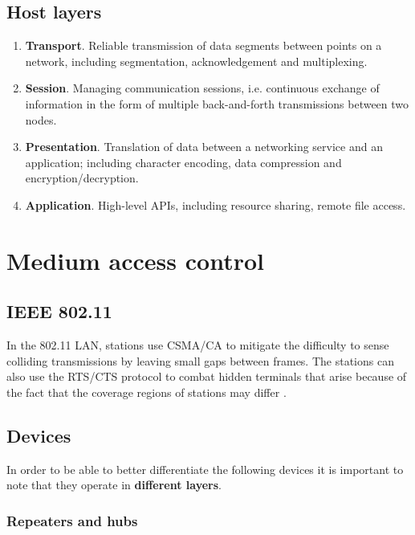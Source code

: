 \subsection{Host layers}

\begin{enumerate}
\item \textbf{Transport}. Reliable transmission of data segments between points on a network, including segmentation, acknowledgement and multiplexing.
\item \textbf{Session}. Managing communication sessions, i.e. continuous exchange of information in the form of multiple back-and-forth transmissions between two nodes.
\item \textbf{Presentation}. Translation of data between a networking service and an application; including character encoding, data compression and encryption/decryption.
\item \textbf{Application}. High-level APIs, including resource sharing, remote file access.
\end{enumerate}

\section{Medium access control}

\subsection{IEEE 802.11}

In the 802.11 LAN, stations use CSMA/CA to mitigate the difficulty to sense colliding transmissions by leaving small gaps between frames. The stations can also use the RTS/CTS protocol to combat hidden terminals that arise because of the fact that the coverage regions of stations may differ  \cite[p.~349]{computer-networks-tanenbaum-2012}.

\subsection{Devices}

In order to be able to better differentiate the following devices it is important to note that they operate in \textbf{different layers}.

\subsubsection{Repeaters and hubs}

